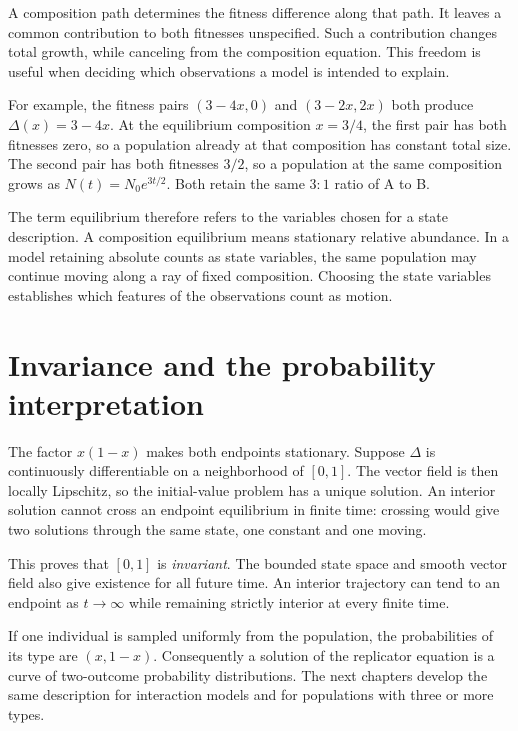 \documentclass[11pt,oneside,openany]{book}
\theoremstyle{definition}
\theoremstyle{remark}
\numberwithin{equation}{chapter}
\begin{document}
A composition path determines the fitness difference along that path. It leaves a common contribution to both fitnesses unspecified. Such a contribution changes total growth, while canceling from the composition equation. This freedom is useful when deciding which observations a model is intended to explain.

For example, the fitness pairs $(3-4x,0)$ and $(3-2x,2x)$ both produce $\Delta(x)=3-4x$. At the equilibrium composition $x=3/4$, the first pair has both fitnesses zero, so a population already at that composition has constant total size. The second pair has both fitnesses $3/2$, so a population at the same composition grows as $N(t)=N_0e^{3t/2}$. Both retain the same $3:1$ ratio of A to B.

The term equilibrium therefore refers to the variables chosen for a state description. A composition equilibrium means stationary relative abundance. In a model retaining absolute counts as state variables, the same population may continue moving along a ray of fixed composition. Choosing the state variables establishes which features of the observations count as motion.

\section{Invariance and the probability interpretation}
The factor $x(1-x)$ makes both endpoints stationary. Suppose $\Delta$ is continuously differentiable on a neighborhood of $[0,1]$. The vector field is then locally Lipschitz, so the initial-value problem has a unique solution. An interior solution cannot cross an endpoint equilibrium in finite time: crossing would give two solutions through the same state, one constant and one moving.

This proves that $[0,1]$ is \emph{invariant}. The bounded state space and smooth vector field also give existence for all future time. An interior trajectory can tend to an endpoint as $t\to\infty$ while remaining strictly interior at every finite time.

If one individual is sampled uniformly from the population, the probabilities of its type are $(x,1-x)$. Consequently a solution of the replicator equation is a curve of two-outcome probability distributions. The next chapters develop the same description for interaction models and for populations with three or more types.

\FloatBarrier
\end{document}
